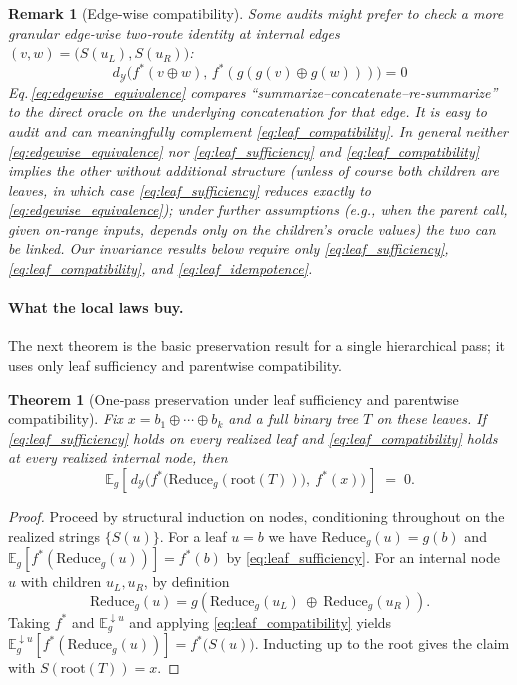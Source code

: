 \documentclass[11pt]{article}
\newtheorem{theorem}{Theorem}
\newtheorem{remark}{Remark}
\newcommand{\Y}{\mathcal{Y}}               %
\newcommand{\fstar}{f^*}               %
\newcommand{\E}{\mathbb{E}}
\newcommand{\concat}{\oplus}                    %
\newcommand{\metric}{d_{\Y}}
\newcommand{\reduce}{\text{Reduce}}
\newcommand{\reduceg}{\reduce_g}
\newcommand{\Eg}{\E_g}     %
\begin{document}
\begin{remark}[Edge-wise compatibility]\label{rem:edgewise_compatibility}
Some audits might prefer to check a more granular \emph{edge‑wise} two‑route identity at internal edges $(v,w)=\big(S(u_L),S(u_R)\big)$:
\begin{equation}\tag{E1}\label{eq:edgewise_equivalence}
\metric\big(\fstar(v\concat w),\,\fstar(g(g(v)\concat g(w)))\big)=0
\end{equation}
Eq.\,\eqref{eq:edgewise_equivalence} compares ``summarize–concatenate–re‑summarize'' to the direct oracle on the underlying concatenation \emph{for that edge}. It is easy to audit and can meaningfully complement \eqref{eq:leaf_compatibility}. In general neither \eqref{eq:edgewise_equivalence} nor \eqref{eq:leaf_sufficiency} and \eqref{eq:leaf_compatibility} implies the other without additional structure (unless of course both children are leaves, in which case \eqref{eq:leaf_sufficiency} reduces exactly to \eqref{eq:edgewise_equivalence}); under further assumptions (e.g., when the parent call, given on‑range inputs, depends only on the children's oracle values) the two can be linked. Our invariance results below require only \eqref{eq:leaf_sufficiency}, \eqref{eq:leaf_compatibility}, and \eqref{eq:leaf_idempotence}.
\end{remark}

\paragraph{What the local laws buy.}
The next theorem is the basic preservation result for a single hierarchical pass; it uses only leaf sufficiency and parentwise compatibility.


\begin{theorem}[One‑pass preservation under leaf sufficiency and parentwise compatibility]\label{thm:one-pass}
Fix $x=b_1\concat \cdots\concat b_k$ and a full binary tree $T$ on these leaves.
If \ref{eq:leaf_sufficiency} holds on every realized leaf and \ref{eq:leaf_compatibility} holds at every realized internal node, then
\[
\Eg\!\left[\,\metric\!\Big(\fstar\big(\reduceg(\mathrm{root}(T))\big),\ \fstar(x)\Big)\,\right]\;=\;0.
\]
\end{theorem}


\begin{proof}
Proceed by structural induction on nodes, conditioning throughout on the realized strings $\{S(u)\}$. For a leaf $u=b$ we have $\reduceg(u)=g(b)$ and $\Eg[\fstar(\reduceg(u))]=\fstar(b)$ by \eqref{eq:leaf_sufficiency}. For an internal node $u$ with children $u_L,u_R$, by definition
\[
\reduceg(u)=g\!\left(\reduceg(u_L)\ \concat\ \reduceg(u_R)\right).
\]
Taking $\fstar$ and $\Eg^{\downarrow u}$ and applying \eqref{eq:leaf_compatibility} yields
$\Eg^{\downarrow u}\!\left[\fstar(\reduceg(u))\right]=\fstar\!\big(S(u)\big)$.
Inducting up to the root gives the claim with $S(\mathrm{root}(T))=x$.
\end{proof}
\end{document}
